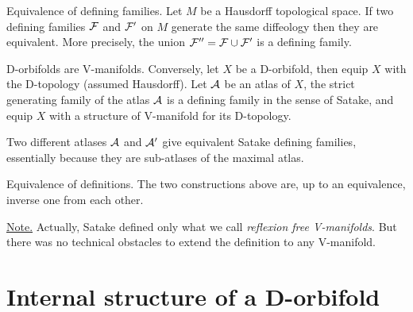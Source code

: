\begin{Article}{Equivalence of defining families.}{}
  Let $M$ be a Hausdorff topological space.
  If two defining families $\mathcal{F}$ and $\mathcal{F}'$ on $M$ generate the same diffeology
  then they are equivalent.
  More precisely,
  the union $\mathcal{F}'' = \mathcal{F} \cup \mathcal{F}'$ is a defining family.
\end{Article}

\begin{Article}{D-orbifolds are V-manifolds.}{}
  Conversely,
  let $X$ be a D-orbifold,
  then equip $X$ with the D-topology (assumed Hausdorff).
  Let $\mathcal{A}$ be an atlas of $X$,
  the strict generating family of the atlas $\mathcal{A}$ is a defining family in the sense of Satake,
  and equip $X$ with a structure of V-manifold for its D-topology.

  Two different atlases $\mathcal{A}$ and $\mathcal{A}'$ give equivalent Satake defining families,
  essentially because they are sub-atlases of the maximal atlas.
\end{Article}

\begin{Article}{Equivalence of definitions.}{}
  The two constructions above are,
  up to an equivalence,
  inverse one from each other.

  \uline{Note.} Actually,
  Satake defined only what we call \emph{reflexion free V-manifolds}.
  But there was no technical obstacles to extend the definition to any V-manifold.
\end{Article}


\section{Internal structure of a D-orbifold}


